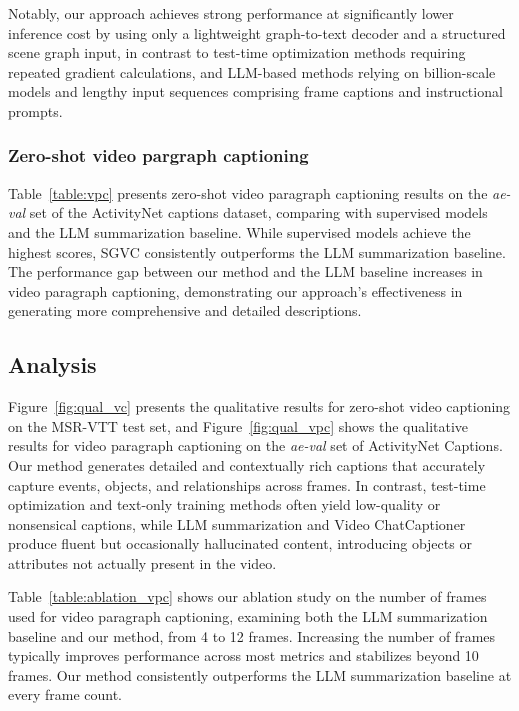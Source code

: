 Notably, our approach achieves strong performance at significantly lower inference cost by using only a lightweight graph-to-text decoder and a structured scene graph input, in contrast to test-time optimization methods requiring repeated gradient calculations, and LLM-based methods relying on billion-scale models and lengthy input sequences comprising frame captions and instructional prompts.



\subsubsection{Zero-shot video pargraph captioning}
Table~\ref{table:vpc} presents zero-shot video paragraph captioning results on the \textit{ae-val} set of the ActivityNet captions dataset, comparing with supervised models and the LLM summarization baseline.
While supervised models achieve the highest scores, SGVC consistently outperforms the LLM summarization baseline. 
The performance gap between our method and the LLM baseline increases in video paragraph captioning, demonstrating our approach's effectiveness in generating more comprehensive and detailed descriptions.
\vspace{-4mm}

\subsection{Analysis}
Figure~\ref{fig:qual_vc} presents the qualitative results for zero-shot video captioning on the MSR-VTT test set, and Figure~\ref{fig:qual_vpc} shows the qualitative results for video paragraph captioning on the \textit{ae-val} set of ActivityNet Captions.
Our method generates detailed and contextually rich captions that accurately capture events, objects, and relationships across frames.
In contrast, test-time optimization and text-only training methods often yield low-quality or nonsensical captions, while LLM summarization and Video ChatCaptioner produce fluent but occasionally hallucinated content, introducing objects or attributes not actually present in the video.


Table~\ref{table:ablation_vpc} shows our ablation study on the number of frames used for video paragraph captioning, examining both the LLM summarization baseline and our method, from 4 to 12 frames.
Increasing the number of frames typically improves performance across most metrics and stabilizes beyond 10 frames. 
Our method consistently outperforms the LLM summarization baseline at every frame count.

\vspace{-2mm}
